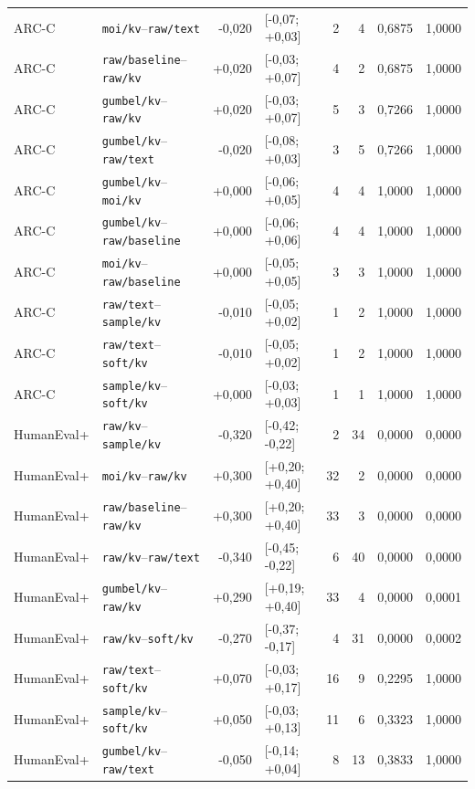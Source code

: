 \begin{longtable}{llrlrrrr}
ARC-C & \texttt{moi/kv}--\texttt{raw/text} & -0,020 & [-0,07; +0,03] & 2 & 4 & 0,6875 & 1,0000 \\
ARC-C & \texttt{raw/baseline}--\texttt{raw/kv} & +0,020 & [-0,03; +0,07] & 4 & 2 & 0,6875 & 1,0000 \\
ARC-C & \texttt{gumbel/kv}--\texttt{raw/kv} & +0,020 & [-0,03; +0,07] & 5 & 3 & 0,7266 & 1,0000 \\
ARC-C & \texttt{gumbel/kv}--\texttt{raw/text} & -0,020 & [-0,08; +0,03] & 3 & 5 & 0,7266 & 1,0000 \\
ARC-C & \texttt{gumbel/kv}--\texttt{moi/kv} & +0,000 & [-0,06; +0,05] & 4 & 4 & 1,0000 & 1,0000 \\
ARC-C & \texttt{gumbel/kv}--\texttt{raw/baseline} & +0,000 & [-0,06; +0,06] & 4 & 4 & 1,0000 & 1,0000 \\
ARC-C & \texttt{moi/kv}--\texttt{raw/baseline} & +0,000 & [-0,05; +0,05] & 3 & 3 & 1,0000 & 1,0000 \\
ARC-C & \texttt{raw/text}--\texttt{sample/kv} & -0,010 & [-0,05; +0,02] & 1 & 2 & 1,0000 & 1,0000 \\
ARC-C & \texttt{raw/text}--\texttt{soft/kv} & -0,010 & [-0,05; +0,02] & 1 & 2 & 1,0000 & 1,0000 \\
ARC-C & \texttt{sample/kv}--\texttt{soft/kv} & +0,000 & [-0,03; +0,03] & 1 & 1 & 1,0000 & 1,0000 \\
\hline
HumanEval+ & \texttt{raw/kv}--\texttt{sample/kv} & -0,320 & [-0,42; -0,22] & 2 & 34 & 0,0000 & 0,0000 \\
HumanEval+ & \texttt{moi/kv}--\texttt{raw/kv} & +0,300 & [+0,20; +0,40] & 32 & 2 & 0,0000 & 0,0000 \\
HumanEval+ & \texttt{raw/baseline}--\texttt{raw/kv} & +0,300 & [+0,20; +0,40] & 33 & 3 & 0,0000 & 0,0000 \\
HumanEval+ & \texttt{raw/kv}--\texttt{raw/text} & -0,340 & [-0,45; -0,22] & 6 & 40 & 0,0000 & 0,0000 \\
HumanEval+ & \texttt{gumbel/kv}--\texttt{raw/kv} & +0,290 & [+0,19; +0,40] & 33 & 4 & 0,0000 & 0,0001 \\
HumanEval+ & \texttt{raw/kv}--\texttt{soft/kv} & -0,270 & [-0,37; -0,17] & 4 & 31 & 0,0000 & 0,0002 \\
HumanEval+ & \texttt{raw/text}--\texttt{soft/kv} & +0,070 & [-0,03; +0,17] & 16 & 9 & 0,2295 & 1,0000 \\
HumanEval+ & \texttt{sample/kv}--\texttt{soft/kv} & +0,050 & [-0,03; +0,13] & 11 & 6 & 0,3323 & 1,0000 \\
HumanEval+ & \texttt{gumbel/kv}--\texttt{raw/text} & -0,050 & [-0,14; +0,04] & 8 & 13 & 0,3833 & 1,0000 \\

\end{longtable}
